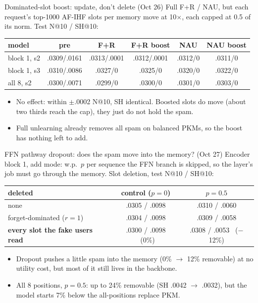\documentclass{beamer}
\begin{document}
\begin{frame}{Dominated-slot boost: update, don't delete (Oct 26)}
Full F+R / NAU, but each request's top-1000 AF-IHF slots per memory move at
10$\times$, each capped at 0.5 of its norm. Test N@10 / SH@10:
\begin{center}
\footnotesize\setlength{\tabcolsep}{3pt}
\begin{tabular}{|l|c|c|c|c|c|}
\hline
model & pre & F+R & F+R boost & NAU & NAU boost \\
\hline
block 1, s2 & .0309/.0161 & .0313/.0001 & .0312/.0001 & .0312/0 & .0311/0 \\
block 1, s3 & .0310/.0086 & .0327/0 & .0325/0 & .0320/0 & .0322/0 \\
all 8, s2   & .0300/.0071 & .0299/0 & .0300/0 & .0301/0 & .0303/0 \\
\hline
\end{tabular}
\end{center}
\begin{itemize}
  \item No effect: within $\pm$.0002 N@10, SH identical. Boosted slots do move
        (about two thirds reach the cap), they just do not hold the spam.
  \item Full unlearning already removes all spam on balanced PKMs, so the
        boost has nothing left to add.
\end{itemize}
\end{frame}

\begin{frame}{FFN pathway dropout: does the spam move into the memory? (Oct 27)}
Encoder block 1, add mode: w.p.\ $p$ per sequence the FFN branch is skipped, so
the layer's job must go through the memory. Slot deletion, test N@10 / SH@10:
\begin{center}
\footnotesize\setlength{\tabcolsep}{3pt}
\begin{tabular}{|l|c|c|}
\hline
deleted & control ($p=0$) & $p=0.5$ \\
\hline
none & .0305 / .0098 & .0310 / .0060 \\
forget-dominated ($r=1$) & .0304 / .0098 & .0309 / .0058 \\
\textbf{every slot the fake users read} & .0300 / .0098 \ (0\%) & .0308 / .0053 \ ($-$12\%) \\
\hline
\end{tabular}
\end{center}
\begin{itemize}
  \item Dropout pushes a little spam into the memory (0\% $\rightarrow$ 12\%
        removable) at no utility cost, but most of it still lives in the backbone.
  \item All 8 positions, $p=0.5$: up to 24\% removable (SH .0042 $\rightarrow$
        .0032), but the model starts 7\% below the all-positions replace PKM.
\end{itemize}
\end{frame}
\end{document}
